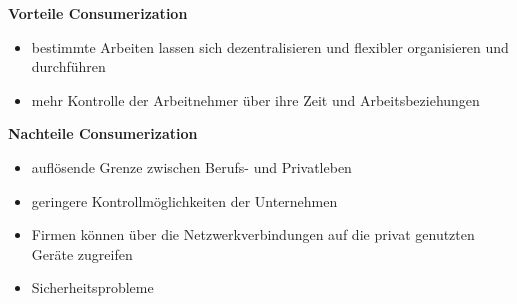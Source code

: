 \documentclass[a4]{scrartcl}
\begin{document}
\begin{minipage}[t]{0.5\textwidth}

\textbf{Vorteile Consumerization} 
\begin{itemize}
\item bestimmte Arbeiten lassen sich dezentralisieren und flexibler organisieren und durchführen
\item mehr Kontrolle der Arbeitnehmer über ihre Zeit und Arbeitsbeziehungen
\end{itemize}

\end{minipage}\begin{minipage}[t]{0.5\textwidth}

\textbf{Nachteile Consumerization} 
\begin{itemize}
\item auflösende Grenze zwischen Berufs- und Privatleben
\item geringere Kontrollmöglichkeiten der Unternehmen
\item Firmen können über die Netzwerkverbindungen auf die privat genutzten Geräte zugreifen
\item Sicherheitsprobleme
\end{itemize}


\end{minipage}
\end{document}
